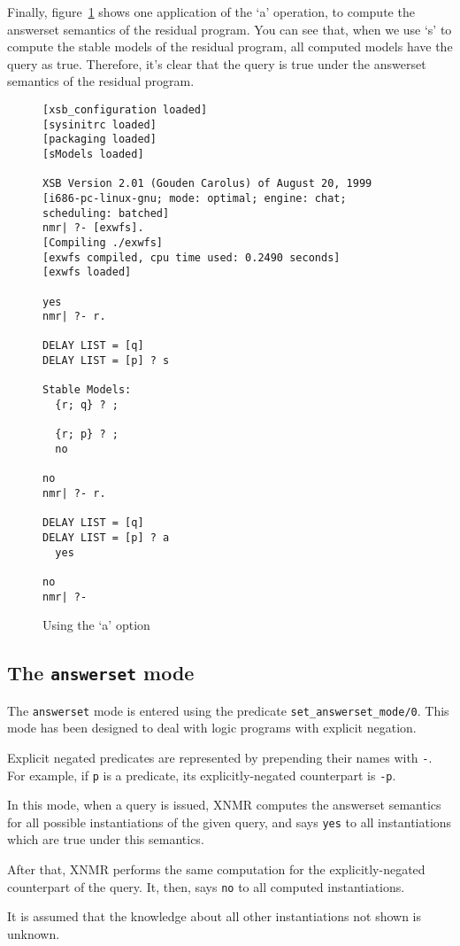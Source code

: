 Finally, figure~\ref{fig:answerset} shows one application of the `a'
operation, to compute the answerset semantics of the residual
program. You can see that, when we use `s' to compute the stable
models of the residual program, all computed models have the query as
true. Therefore, it's clear that the query is true under the answerset
semantics of the residual program. 

\begin{figure}
\label{fig:answerset}
\centering
\scriptsize
\begin{verbatim}
[xsb_configuration loaded]
[sysinitrc loaded]
[packaging loaded]
[sModels loaded]

XSB Version 2.01 (Gouden Carolus) of August 20, 1999
[i686-pc-linux-gnu; mode: optimal; engine: chat; scheduling: batched]
nmr| ?- [exwfs].
[Compiling ./exwfs]
[exwfs compiled, cpu time used: 0.2490 seconds]
[exwfs loaded]

yes
nmr| ?- r.

DELAY LIST = [q]
DELAY LIST = [p] ? s

Stable Models: 
  {r; q} ? ;

  {r; p} ? ;
  no

no
nmr| ?- r.

DELAY LIST = [q]
DELAY LIST = [p] ? a
  yes

no
nmr| ?- 
\end{verbatim}
\caption{Using the `a' option}
\end{figure}

\subsection{The \texttt{answerset} mode}

The \texttt{answerset} mode is entered using the predicate
\texttt{set\_answerset\_mode/0}. This mode has been designed to deal
with logic programs with explicit negation.

Explicit negated predicates are represented by prepending their names
with \verb#-#. For example, if \verb#p# is a predicate, its
explicitly-negated counterpart is \verb#-p#.

In this mode, when a query is issued, XNMR computes the answerset
semantics for all possible instantiations of the given query, and says
\verb#yes# to all instantiations which are true under this semantics. 

After that, XNMR performs the same computation for the
explicitly-negated counterpart of the query. It, then, says \verb#no# to
all computed instantiations. 

It is assumed that the knowledge about all other instantiations not
shown is unknown.

